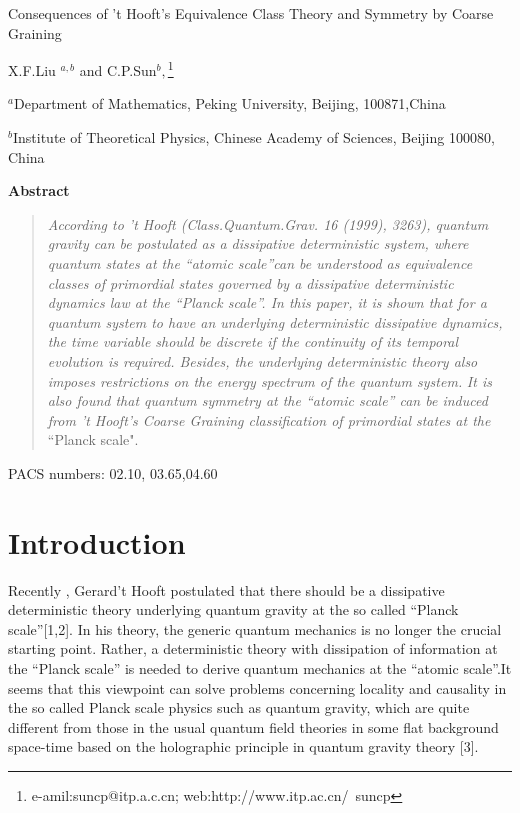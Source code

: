 \documentclass[a4paper,12pt]{article}
\begin{document}
\begin{center}
{\LARGE Consequences of 't Hooft's Equivalence Class Theory and Symmetry by }%
{\Large Coarse Graining}

X.F.Liu $^{a,b}$ and C.P.Sun$^b,$\footnote{%
e-amil:suncp@itp.a.c.cn; web:http://www.itp.ac.cn/~suncp}

$^a$Department of Mathematics, Peking University, Beijing, 100871,China

\bigskip $^b$Institute of Theoretical Physics, Chinese Academy of Sciences,
Beijing 100080, China

\textbf{Abstract}
\end{center}

\begin{quotation}
\textit{According to 't Hooft (Class.Quantum.Grav. 16 (1999), 3263), quantum
gravity can be postulated as a dissipative deterministic system, where
quantum states at the ``atomic scale''can be understood as equivalence
classes of primordial states governed by a dissipative deterministic
dynamics law at the ``Planck scale''. In this paper, it is shown that for a
quantum system to have an underlying deterministic dissipative dynamics, the
time variable should be discrete if the continuity of its temporal evolution
is required. Besides, the underlying deterministic theory also imposes
restrictions on the energy spectrum of the quantum system. } \textit{It is
also found that quantum symmetry at the ``atomic scale'' can be induced from
't Hooft's Coarse Graining classification of primordial states at the}
``Planck scale".
\end{quotation}

PACS numbers: 02.10, 03.65,04.60

\section{Introduction}

Recently , Gerard't Hooft postulated that there should be a dissipative
deterministic theory underlying quantum gravity at the so called ``Planck
scale''[1,2]. In his theory, the generic quantum mechanics is no longer the
crucial starting point. Rather, a deterministic theory with dissipation of
information at the ``Planck scale'' is needed to derive quantum mechanics at
the ``atomic scale''.It seems that this viewpoint can solve problems
concerning locality and causality in the so called Planck scale physics such
as quantum gravity, which are quite different from those in the usual
quantum field theories in some flat background space-time based on the
holographic principle in quantum gravity theory [3].
\end{document}
